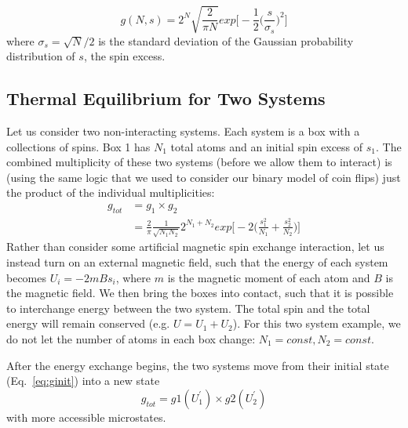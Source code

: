 \begin{equation}
g(N,s) = 2^N \sqrt{\frac{2}{\pi N}} exp\bigg[-\frac{1}{2}\bigg(\frac{s}{\sigma_s}\bigg)^2\bigg]
\end{equation}
where $\sigma_s = \sqrt{N}/2$ is the standard deviation of the Gaussian probability distribution of $s$, the spin excess.

\subsection{Thermal Equilibrium for Two Systems}
Let us consider two non-interacting systems. Each system is a box with a collections of
spins. Box 1 has $N_1$ total atoms and an initial spin excess of $s_1$.
The combined multiplicity of these 
two systems (before we allow them to interact) is (using the same logic that we used to consider
our binary model of coin flips) just the product of the individual multiplicities:
\begin{align}
g_{tot} &= g_1 \times g_2 \\
        &= \frac{2}{\pi} \frac{1}{\sqrt{N_1 N_2}} 2^{N_1 + N_2} exp\bigg[-2\bigg(\frac{s_1^2}{N_1} + \frac{s_2^2}{N_2}\bigg)\bigg]
\label{eq:ginit}
\end{align}
Rather than consider some artificial magnetic spin exchange interaction, let us instead
turn on an external magnetic field, such that the energy of each system becomes
$U_i = -2 m B s_i$, where $m$ is the magnetic moment of each atom and $B$ is the magnetic
field. We then bring the boxes into contact, such that it is possible to interchange energy
between the two system. The total spin and the total energy will remain conserved
(e.g. $U = U_1 + U_2$). For this two system example, we do not let the number of atoms in
each box change: $N_1 = const, N_2 = const$.

After the energy exchange begins, the two systems move from their 
initial state (Eq.~\ref{eq:ginit}) into a new state
\begin{equation}
g_{tot} = g1(U_1^\prime) \times g2(U_2^\prime)
\end{equation}
with more accessible microstates.



